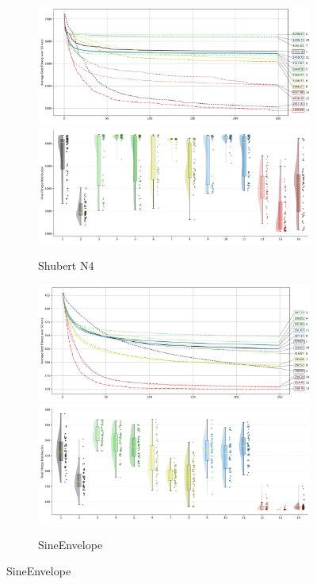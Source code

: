 \begin{figure}[p]\ContinuedFloat
\renewcommand\thesubfigure{C.\arabic{figure}.\arabic{subfigure}} %

    \centering



\begin{subfigure}{1\textwidth}
    \centering
    \includegraphics[width=.49\textwidth]{Figures/results/500/Shubert_N4_All_selected_algorithms_dim500_annot_legend.png}
    \includegraphics[width=.49\textwidth]{Figures/results/500/Shubert_N4_all_dim500_raincloud_vertical.png}
    \caption{Shubert N4}
\end{subfigure}

\begin{subfigure}{1\textwidth}
    \centering
    \includegraphics[width=.49\textwidth]{Figures/results/500/SineEnvelope_All_selected_algorithms_dim500_annot_legend.png}
    \includegraphics[width=.49\textwidth]{Figures/results/500/SineEnvelope_all_dim500_raincloud_vertical.png}
    \caption{SineEnvelope}
\end{subfigure}


\end{figure}
